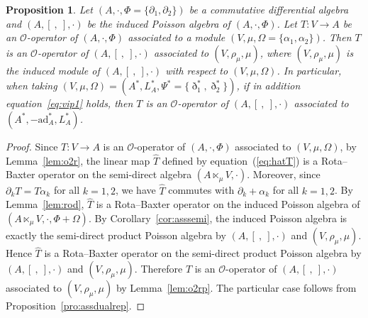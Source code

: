 \documentclass[pdftex]{sigma}
\numberwithin{equation}{section}
\newtheorem{Proposition}[Theorem]{Proposition}
{ \theoremstyle{definition}
	\newtheorem{Definition}[Theorem]{Definition}
	\newtheorem{Note}[Theorem]{Note}
	\newtheorem{Example}[Theorem]{Example}
	\newtheorem{Remark}[Theorem]{Remark} }
\newcommand{\ad}{\mathrm{ad}}
\begin{document}
\begin{Proposition}\label{pro:assopp}
 Let $(A, \cdot, \Phi = \{\partial_1, \partial_2\})$ be a commutative differential algebra and
 $(A, [\ ,\ ], \cdot)$ be the induced Poisson algebra of $(A, \cdot, \Phi)$.
 Let $T\colon V \to A$ be an $\mathcal{O}$-operator of $(A, \cdot, \Phi)$
 associated to a module $(V, \mu, \Omega = \{\alpha_1, \alpha_2\})$.
 Then $T$ is an $\mathcal{O}$-operator of $(A, [\ ,\ ], \cdot)$ associated to $(V, \rho_\mu, \mu)$,
 where $(V, \rho_\mu,\mu)$ is the induced module of $(A, [\ ,\ ], \cdot)$ with respect to $(V, \mu, \Omega)$.
 In particular, when taking $(V, \mu,\Omega) = (A^*, L_A^*, \Psi^*=\{\eth_1^*, \eth_2^*\})$,
 if in addition equation~\eqref{eq:vip1} holds, then $T$ is an $\mathcal{O}$-operator of $(A, [\ ,\ ], \cdot)$ associated to $(A^*, -\ad_A^* , L_A^*)$.
\end{Proposition}
\begin{proof}
 Since $T\colon V \to A$ is an $\mathcal{O}$-operator of $(A, \cdot, \Phi)$
 associated to $(V, \mu, \Omega)$, by Lemma~\ref{lem:o2r}, the linear map $\hat T$ defined by equation~(\ref{eq:hatT}) is a Rota--Baxter operator on the semi-direct algebra $(A \ltimes_\mu V, \cdot)$. Moreover, since $\partial_k T = T\alpha_k$ for all $k=1,2$, we have $\hat T$ commutes with $\partial_k + \alpha_k$ for all $k=1,2$.
 By Lemma~\ref{lem:rod}, $\hat T$ is a Rota--Baxter operator on the induced Poisson algebra of $(A \ltimes_\mu V, \cdot, \Phi + \Omega)$.
 By Corollary~\ref{cor:asssemi}, the induced Poisson algebra is exactly the semi-direct product Poisson algebra by $(A, [\ ,\ ], \cdot)$ and $(V, \rho_\mu, \mu)$. Hence $\hat T$ is a Rota--Baxter operator on the semi-direct product Poisson algebra by $(A, [\ ,\ ], \cdot)$ and $(V, \rho_\mu, \mu)$.
 Therefore $T$ is an $\mathcal{O}$-operator of $(A, [\ ,\ ], \cdot)$ associated to $(V, \rho_\mu, \mu)$ by Lemma~\ref{lem:o2rp}.
 The particular case follows from Proposition~\ref{pro:assdualrep}.
\end{proof}
\end{document}
